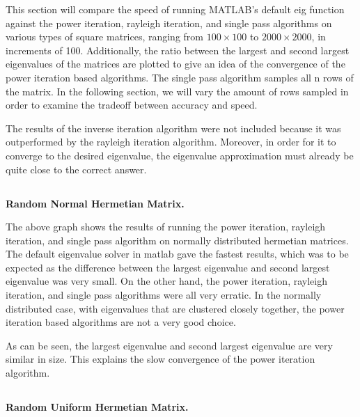 \documentclass[11pt]{amsart}
\begin{document}
This section will compare the speed of running MATLAB's default eig function against the power iteration, rayleigh iteration, and single pass algorithms on various types of square matrices, ranging from $100 \times 100$ to $ 2000 \times 2000$, in increments of 100. Additionally, the ratio between the largest and second largest eigenvalues of the matrices are plotted to give an idea of the convergence of the power iteration based algorithms. The single pass algorithm samples all n rows of the matrix. In the following section, we will vary the amount of rows sampled in order to examine the tradeoff between accuracy and speed. 

The results of the inverse iteration algorithm were not included because it was outperformed by the rayleigh iteration algorithm. Moreover, in order for it to converge to the desired eigenvalue, the eigenvalue approximation must already be quite close to the correct answer.

\subsection{} \textbf{Random Normal Hermetian Matrix.}

\begin{center}
\end{center}

The above graph shows the results of running the power iteration, rayleigh iteration, and single pass algorithm on normally distributed hermetian matrices. The default eigenvalue solver in matlab gave the fastest results, which was to be expected as the difference between the largest eigenvalue and second largest eigenvalue was very small. On the other hand, the power iteration, rayleigh iteration, and single pass algorithms were all very erratic. In the normally distributed case, with eigenvalues that are clustered closely together, the power iteration based algorithms are not a very good choice.

\begin{center}
\end{center}

As can be seen, the largest eigenvalue and second largest eigenvalue are very similar in size. This explains the slow convergence of the power iteration algorithm.

\subsection{} \textbf{Random Uniform Hermetian Matrix.}
\end{document}
